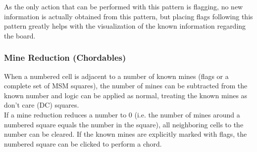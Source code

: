 As the only action that can be performed with this pattern is flagging, no new information is actually obtained from this pattern, but placing flags following this pattern greatly helps with the visualization of the known information regarding the board.\\

\newpage
\subsubsection*{Mine Reduction (Chordables)}
When a numbered cell is adjacent to a number of known mines (flags or a complete set of MSM squares), the number of mines can be subtracted from the known number and logic can be applied as normal, treating the known mines as don't care (DC) squares.\\

If a mine reduction reduces a number to 0 (i.e. the number of mines around a numbered square equals the number in the square), all neighboring cells to the number can be cleared. If the known mines are explicitly marked with flags, the numbered square can be clicked to perform a chord.


